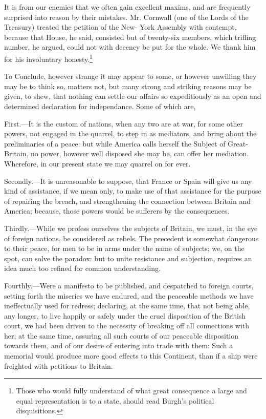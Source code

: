 \documentclass[12pt,oneside]{memoir}
\begin{document}
It is from our enemies that we often gain excellent maxims, and are frequently surprised into reason by their mistakes. Mr. Cornwall (one of the Lords of the Treasury) treated the petition of the New- York Assembly with contempt, because that House, he said, consisted but of twenty-six members, which trifling number, he argued, could not with decency be put for the whole. We thank him for his involuntary honesty.\footnote{Those who would fully understand of what great consequence a large and equal representation is to a state, should read Burgh's political disquisitions.}

To Conclude, however strange it may appear to some, or however unwilling they may be to think so, matters not, but many strong and striking reasons may be given, to shew, that nothing can settle our affairs so expeditiously as an open and determined declaration for independance. Some of which are,

First.---It is the custom of nations, when any two are at war, for some other powers, not engaged in the quarrel, to step in as mediators, and bring about the preliminaries of a peace: but while America calls herself the Subject of Great-Britain, no power, however well disposed she may be, can offer her mediation. Wherefore, in our present state we may quarrel on for ever.

Secondly.---It is unreasonable to suppose, that France or Spain will give us any kind of assistance, if we mean only, to make use of that assistance for the purpose of repairing the breach, and strengthening the connection between Britain and America; because, those powers would be sufferers by the consequences.

Thirdly.---While we profess ourselves the subjects of Britain, we must, in the eye of foreign nations, be considered as rebels. The precedent is somewhat dangerous to their peace, for men to be in arms under the name of subjects; we, on the spot, can solve the paradox: but to unite resistance and subjection, requires an idea much too refined for common understanding.

Fourthly.---Were a manifesto to be published, and despatched to foreign courts, setting forth the miseries we have endured, and the peaceable methods we have ineffectually used for redress; declaring, at the same time, that not being able, any longer, to live happily or safely under the cruel disposition of the British court, we had been driven to the necessity of breaking off all connections with her; at the same time, assuring all such courts of our peaceable disposition towards them, and of our desire of entering into trade with them: Such a memorial would produce more good effects to this Continent, than if a ship were freighted with petitions to Britain.
\end{document}
